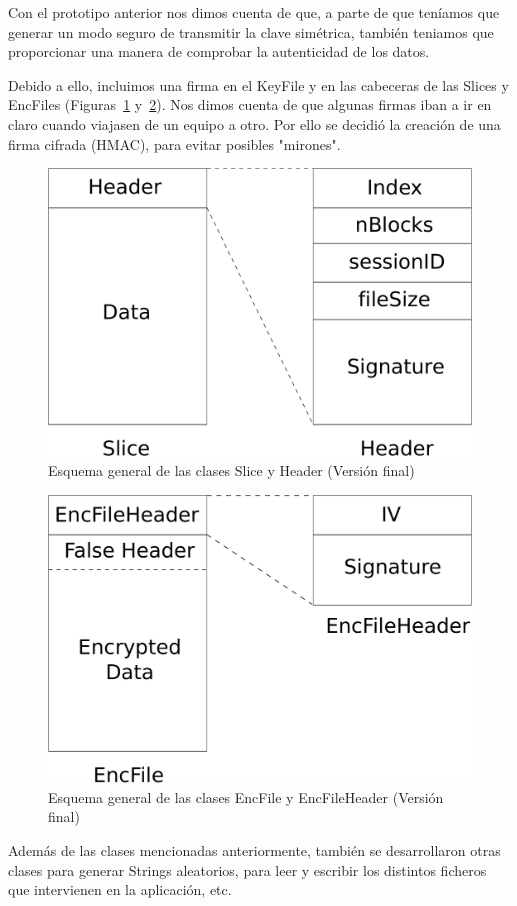 Con el prototipo anterior nos dimos cuenta de que, a parte de que teníamos que
generar un modo seguro de transmitir la clave simétrica, también teniamos que
proporcionar una manera de comprobar la autenticidad de los datos.

Debido a ello, incluimos una firma en el KeyFile y en las cabeceras de las
Slices y EncFiles (Figuras~\ref{fig:Slice_Header_2} y~\ref{fig:EncFile_Header_2}).
Nos dimos cuenta de que algunas firmas iban a ir en claro cuando viajasen de un
equipo a otro. Por ello se decidió la creación de una firma cifrada (HMAC),
para evitar posibles "mirones".

\begin{figure}[ht]
  \centering
  \includegraphics[scale=0.4]{Figures/Slice_Header_2}
  \decoRule
  \caption[Slice - Header (Versión final)]{Esquema general de las clases Slice y Header (Versión final)}
  \label{fig:Slice_Header_2}
\end{figure}

\begin{figure}[ht]
  \centering
  \includegraphics[scale=0.4]{Figures/EncFile_Header_2}
  \decoRule
  \caption[EncFile - EncFileHeader (Versión final)]{Esquema general de las clases EncFile y EncFileHeader (Versión final)}
  \label{fig:EncFile_Header_2}
\end{figure}

Además de las clases mencionadas anteriormente, también se desarrollaron otras
clases para generar Strings aleatorios, para leer y escribir los distintos
ficheros que intervienen en la aplicación, etc.
